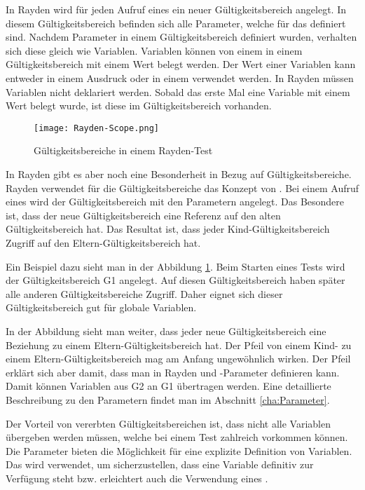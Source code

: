 In Rayden wird für jeden Aufruf eines  ein neuer Gültigkeitsbereich angelegt. In diesem Gültigkeitsbereich befinden sich alle Parameter, welche für das  definiert sind. Nachdem Parameter in einem Gültigkeitsbereich definiert wurden, verhalten sich diese gleich wie Variablen. Variablen können von einem  in einem Gültigkeitsbereich mit einem Wert belegt werden. Der Wert einer Variablen kann entweder in einem Ausdruck oder in einem  verwendet werden. In Rayden müssen Variablen nicht deklariert werden. Sobald das erste Mal eine Variable mit einem Wert belegt wurde, ist diese im Gültigkeitsbereich vorhanden.

\begin{figure}[h]
\centering
\texttt{[image: Rayden-Scope.png]}
\caption{Gültigkeitsbereiche in einem Rayden-Test}
\label{fig:rayden-scope}
\end{figure}

\SuperPar
In Rayden gibt es aber noch eine Besonderheit in Bezug auf Gültigkeitsbereiche. Rayden verwendet für die Gültigkeitsbereiche das Konzept von . Bei einem Aufruf eines  wird der Gültigkeitsbereich mit den Parametern angelegt. Das Besondere ist, dass der neue Gültigkeitsbereich eine Referenz auf den alten Gültigkeitsbereich hat. Das Resultat ist, dass jeder Kind-Gültigkeitsbereich Zugriff auf den Eltern-Gültigkeitsbereich hat.

\SuperPar
Ein Beispiel dazu sieht man in der Abbildung \ref{fig:rayden-scope}. Beim Starten eines Tests wird der Gültigkeitsbereich G1 angelegt. Auf diesen Gültigkeitsbereich haben später alle anderen Gültigkeitsbereiche Zugriff. Daher eignet sich dieser Gültigkeitsbereich gut für globale Variablen.

\SuperPar
In der Abbildung sieht man weiter, dass jeder neue Gültigkeitsbereich eine Beziehung zu einem Eltern-Gültigkeitsbereich hat. Der Pfeil von einem Kind- zu einem Eltern-Gültigkeitsbereich mag am Anfang ungewöhnlich wirken. Der Pfeil erklärt sich aber damit, dass man in Rayden  und -Parameter definieren kann. Damit können Variablen aus G2 an G1 übertragen werden. Eine detaillierte Beschreibung zu den Parametern findet man im Abschnitt \ref{cha:Parameter}.

\SuperPar
Der Vorteil von vererbten Gültigkeitsbereichen ist, dass nicht alle Variablen übergeben werden müssen, welche bei einem Test zahlreich vorkommen können. Die Parameter bieten die Möglichkeit für eine explizite Definition von Variablen. Das wird verwendet, um sicherzustellen, dass eine Variable definitiv zur Verfügung steht bzw. erleichtert auch die Verwendung eines .

